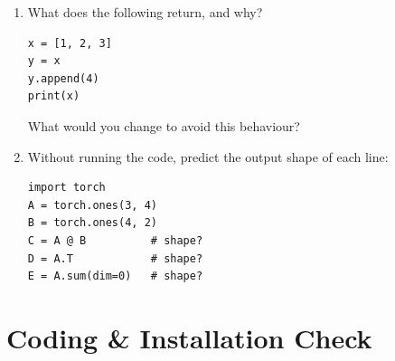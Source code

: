 \documentclass[12pt, a4paper]{scrartcl}
\begin{document}
\begin{enumerate}
\item What does the following return, and why?

\begin{verbatim}
x = [1, 2, 3]
y = x
y.append(4)
print(x)
\end{verbatim}

What would you change to avoid this behaviour?

\item Without running the code, predict the output shape of each line:

\begin{verbatim}
import torch
A = torch.ones(3, 4)
B = torch.ones(4, 2)
C = A @ B          # shape?
D = A.T            # shape?
E = A.sum(dim=0)   # shape?
\end{verbatim}

\end{enumerate}

\section{Coding \& Installation Check}
\end{document}
